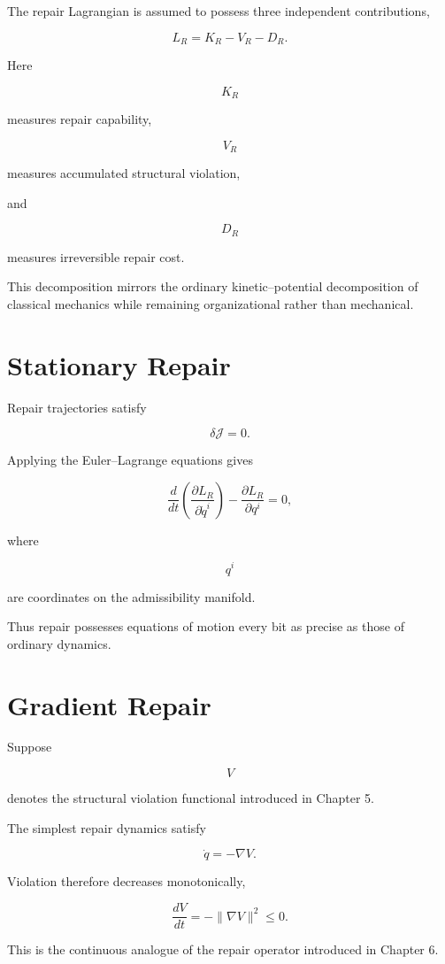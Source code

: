 \documentclass[11pt,oneside]{book}
\numberwithin{equation}{chapter}
\theoremstyle{definition}
\theoremstyle{plain}
\begin{document}
The repair Lagrangian is assumed to possess three independent
contributions,

\[
L_R
=
K_R
-
V_R
-
D_R.
\]

Here

\[
K_R
\]

measures repair capability,

\[
V_R
\]

measures accumulated structural violation,

and

\[
D_R
\]

measures irreversible repair cost.

This decomposition mirrors the ordinary kinetic--potential decomposition of
classical mechanics while remaining organizational rather than mechanical.

\section{Stationary Repair}

Repair trajectories satisfy

\[
\delta
\mathcal J
=
0.
\]

Applying the Euler--Lagrange equations gives

\[
\frac{d}{dt}
\left(
\frac{\partial L_R}
{\partial\dot q^i}
\right)
-
\frac{\partial L_R}
{\partial q^i}
=
0,
\]

where

\[
q^i
\]

are coordinates on the admissibility manifold.

Thus repair possesses equations of motion every bit as precise as those of
ordinary dynamics.

\section{Gradient Repair}

Suppose

\[
V
\]

denotes the structural violation functional introduced in Chapter 5.

The simplest repair dynamics satisfy

\[
\dot q
=
-
\nabla V.
\]

Violation therefore decreases monotonically,

\[
\frac{dV}{dt}
=
-
\|
\nabla V
\|^2
\le
0.
\]

This is the continuous analogue of the repair operator introduced in Chapter
6.
\end{document}
